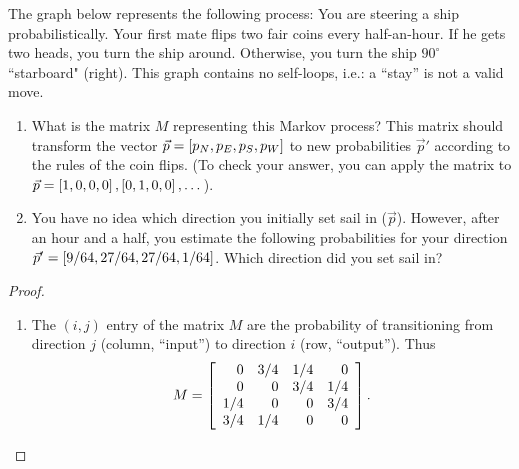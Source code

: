 \documentclass{tutorial}
\begin{document}
\begin{prob}
The graph below represents the following process: You are steering a ship probabilistically. Your first mate flips two fair coins every half-an-hour. If he gets two heads, you turn the ship around. Otherwise, you turn the ship $90^{\circ}$ ``starboard" (right). This graph contains no self-loops, i.e.: a ``stay'' is not a valid move.
\begin{center}  \end{center}
\begin{enumerate}[label=(\alph*)]
\item What is the matrix $M$ representing this Markov process? This matrix should transform the vector $\vec{p} = \left[ p_N, p_E, p_S, p_W \right]$ to new probabilities $\vec{p}'$ according to the rules of the coin flips. (To check your answer, you can apply the matrix to $\vec{p} = \left[ 1,0,0,0 \right], \left[ 0,1,0,0 \right], \dots$).
\item You have no idea which direction you initially set sail in ($\vec{p}$). However, after an hour and a half, you estimate the following probabilities for your direction $\vec{p}' = \left[ 9/64, 27/64, 27/64, 1/64 \right]$. Which direction did you set sail in?
\end{enumerate}
\end{prob} \ifsolns \begin{proof}
\begin{enumerate}
\item The $(i,j)$ entry of the matrix $M$ are the probability of transitioning from direction $j$ (column, ``input'') to direction $i$ (row, ``output''). Thus
\[
  M = \left[ \begin{array}{rrrr}
      0 & 3/4 & 1/4 &   0 \\
      0 &   0 & 3/4 & 1/4 \\
    1/4 &   0 &   0 & 3/4 \\
    3/4 & 1/4 &   0 &   0 \\
  \end{array} \right] .
\]
\end{enumerate}
\end{proof}
\end{document}
